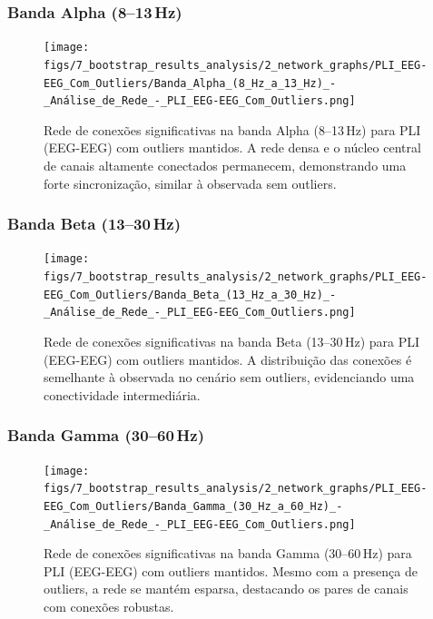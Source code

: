 \subsubsection{\texorpdfstring{Banda Alpha (8--13\,Hz)}{Banda Alpha (8-13 Hz)}}
\begin{figure}[htb]
  \centering
  \texttt{[image: figs/7\_bootstrap\_results\_analysis/2\_network\_graphs/PLI\_EEG-EEG\_Com\_Outliers/Banda\_Alpha\_(8\_Hz\_a\_13\_Hz)\_-\_Análise\_de\_Rede\_-\_PLI\_EEG-EEG\_Com\_Outliers.png]}
  \caption{Rede de conexões significativas na banda Alpha (8--13\,Hz) para PLI (EEG-EEG) com outliers mantidos. A rede densa e o núcleo central de canais altamente conectados permanecem, demonstrando uma forte sincronização, similar à observada sem outliers.}
  \label{fig:rede_pli_alpha_com}
\end{figure}

\subsubsection{\texorpdfstring{Banda Beta (13--30\,Hz)}{Banda Beta (13-30 Hz)}}
\begin{figure}[htb]
  \centering
  \texttt{[image: figs/7\_bootstrap\_results\_analysis/2\_network\_graphs/PLI\_EEG-EEG\_Com\_Outliers/Banda\_Beta\_(13\_Hz\_a\_30\_Hz)\_-\_Análise\_de\_Rede\_-\_PLI\_EEG-EEG\_Com\_Outliers.png]}
  \caption{Rede de conexões significativas na banda Beta (13--30\,Hz) para PLI (EEG-EEG) com outliers mantidos. A distribuição das conexões é semelhante à observada no cenário sem outliers, evidenciando uma conectividade intermediária.}
  \label{fig:rede_pli_beta_com}
\end{figure}

\subsubsection{\texorpdfstring{Banda Gamma (30--60\,Hz)}{Banda Gamma (30-60 Hz)}}
\begin{figure}[htb]
  \centering
  \texttt{[image: figs/7\_bootstrap\_results\_analysis/2\_network\_graphs/PLI\_EEG-EEG\_Com\_Outliers/Banda\_Gamma\_(30\_Hz\_a\_60\_Hz)\_-\_Análise\_de\_Rede\_-\_PLI\_EEG-EEG\_Com\_Outliers.png]}
  \caption{Rede de conexões significativas na banda Gamma (30--60\,Hz) para PLI (EEG-EEG) com outliers mantidos. Mesmo com a presença de outliers, a rede se mantém esparsa, destacando os pares de canais com conexões robustas.}
  \label{fig:rede_pli_gamma_com}
\end{figure}

